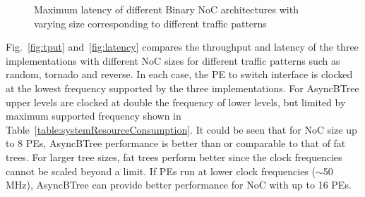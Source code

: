 \begin{figure}[t]
\centering     %
{}
\caption{Maximum latency of different Binary NoC architectures with varying size corresponding to different traffic patterns}
\label{fig:latmax}
\end{figure}

Fig.~\ref{fig:tput} and~\ref{fig:latency} compares the throughput and latency of the three implementations with different NoC sizes for different traffic patterns such as random, tornado and reverse.
In each case, the PE to switch interface is clocked at the lowest frequency supported by the three implementations.
For AsyncBTree upper levels are clocked at double the frequency of lower levels, but limited by maximum supported frequency shown in Table~\ref{table:systemResourceConsumption}.
It could be seen that for NoC size up to 8 PEs, AsyncBTree performance is better than or comparable to that of fat trees.
For larger tree sizes, fat trees perform better since the clock frequencies cannot be scaled beyond a limit.
If PEs run at lower clock frequencies ($\sim$50 MHz), AsyncBTree can provide better performance for NoC with up to 16 PEs. 

